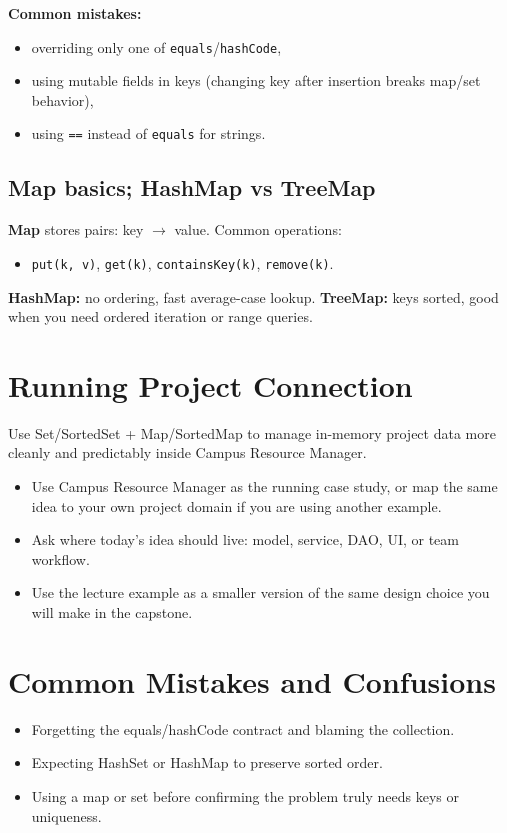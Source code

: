\documentclass[11pt]{article}
\begin{document}
\textbf{Common mistakes:}
\begin{itemize}
  \item overriding only one of \texttt{equals}/\texttt{hashCode},
  \item using mutable fields in keys (changing key after insertion breaks map/set behavior),
  \item using \texttt{==} instead of \texttt{equals} for strings.
\end{itemize}

\subsection{Map basics; HashMap vs TreeMap}
\textbf{Map} stores pairs: key $\rightarrow$ value.
Common operations:
\begin{itemize}
  \item \texttt{put(k, v)}, \texttt{get(k)}, \texttt{containsKey(k)}, \texttt{remove(k)}.
\end{itemize}

\textbf{HashMap:} no ordering, fast average-case lookup.
\textbf{TreeMap:} keys sorted, good when you need ordered iteration or range queries.
\notesources{\OOPSUnitVSources}

\section{Running Project Connection}
Use Set/SortedSet + Map/SortedMap to manage in-memory project data more cleanly and predictably inside Campus Resource Manager.
\begin{itemize}
  \item Use Campus Resource Manager as the running case study, or map the same idea to your own project domain if you are using another example.
  \item Ask where today's idea should live: model, service, DAO, UI, or team workflow.
  \item Use the lecture example as a smaller version of the same design choice you will make in the capstone.
\end{itemize}
\notesources{\OOPSUnitVSources}

\section{Common Mistakes and Confusions}
\begin{itemize}
  \item Forgetting the equals/hashCode contract and blaming the collection.
  \item Expecting HashSet or HashMap to preserve sorted order.
  \item Using a map or set before confirming the problem truly needs keys or uniqueness.
\end{itemize}
\notesources{\OOPSUnitVSources}
\end{document}
